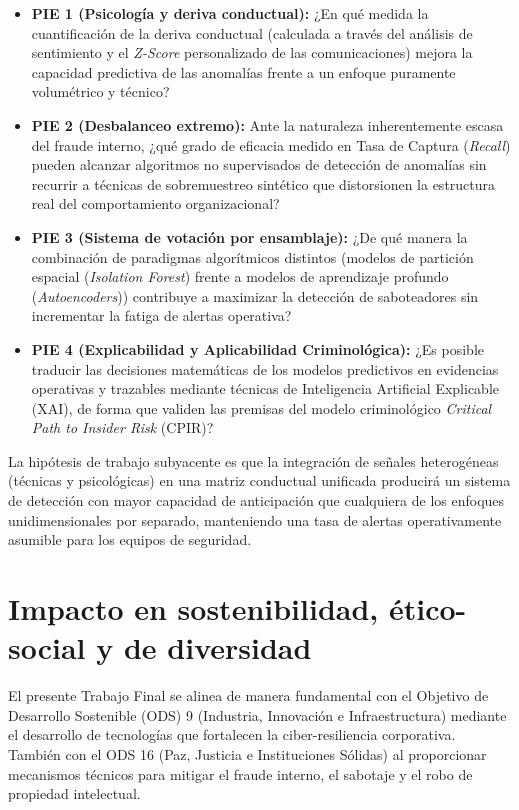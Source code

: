 \documentclass[IB]{TFUOC}%
\begin{document}
\begin{itemize}
    \item \textbf{PIE 1 (Psicología y deriva conductual):} ¿En qué medida la cuantificación de la deriva conductual (calculada a través del análisis de sentimiento y el \textit{Z-Score} personalizado de las comunicaciones) mejora la capacidad predictiva de las anomalías frente a un enfoque puramente volumétrico y técnico?

    \item \textbf{PIE 2 (Desbalanceo extremo):} Ante la naturaleza inherentemente escasa del fraude interno, ¿qué grado de eficacia medido en Tasa de Captura (\textit{Recall}) pueden alcanzar algoritmos no supervisados de detección de anomalías sin recurrir a técnicas de sobremuestreo sintético que distorsionen la estructura real del comportamiento organizacional?

    \item \textbf{PIE 3 (Sistema de votación por ensamblaje):} ¿De qué manera la combinación de paradigmas algorítmicos distintos (modelos de partición espacial (\textit{Isolation Forest}) frente a modelos de aprendizaje profundo (\textit{Autoencoders})) contribuye a maximizar la detección de saboteadores sin incrementar la fatiga de alertas operativa?

    \item \textbf{PIE 4 (Explicabilidad y Aplicabilidad Criminológica):} ¿Es posible traducir las decisiones matemáticas de los modelos predictivos en evidencias operativas y trazables mediante técnicas de Inteligencia Artificial Explicable (XAI), de forma que validen las premisas del modelo criminológico \textit{Critical Path to Insider Risk} (CPIR)?
\end{itemize}

\noindent La hipótesis de trabajo subyacente es que la integración de señales heterogéneas (técnicas y psicológicas) en una matriz conductual unificada producirá un sistema de detección con mayor capacidad de anticipación que cualquiera de los enfoques unidimensionales por separado, manteniendo una tasa de alertas operativamente asumible para los equipos de seguridad.

\section{Impacto en sostenibilidad, ético-social y de diversidad}
\label{s:etic}

El presente Trabajo Final se alinea de manera fundamental con el Objetivo de Desarrollo Sostenible (ODS) 9 (Industria, Innovación e Infraestructura) mediante el desarrollo de tecnologías que fortalecen la ciber-resiliencia corporativa. También con el ODS 16 (Paz, Justicia e Instituciones Sólidas) al proporcionar mecanismos técnicos para mitigar el fraude interno, el sabotaje y el robo de propiedad intelectual.
\end{document}
